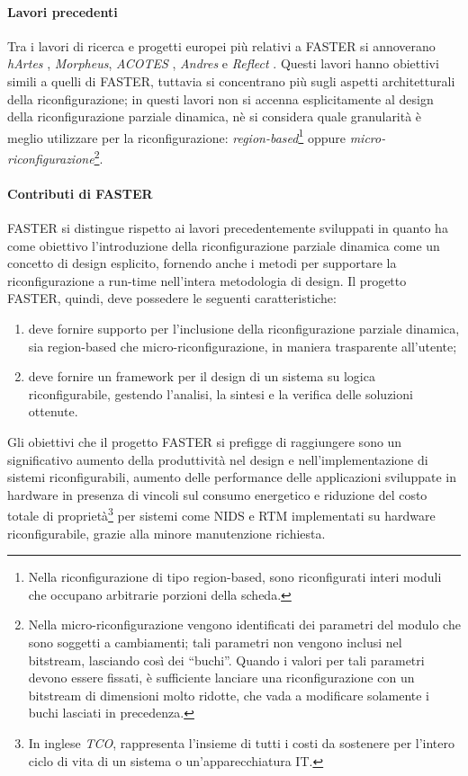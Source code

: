 \paragraph{Lavori precedenti}
Tra i lavori di ricerca e progetti europei più relativi a \ac{FASTER} si 
annoverano \emph{hArtes} \cite{HArtes}, \emph{Morpheus}, \emph{ACOTES} 
\cite{AcotesUrl, ACOTES}, \emph{Andres} e \emph{Reflect} \cite{Reflect}. %
Questi lavori hanno obiettivi simili a quelli di \ac{FASTER}, tuttavia si 
concentrano più sugli aspetti architetturali della riconfigurazione; in questi 
lavori non si accenna esplicitamente al design della riconfigurazione parziale 
dinamica, nè si considera quale granularità è meglio utilizzare per la 
riconfigurazione: \emph{region-based}\footnote{Nella riconfigurazione di tipo 
region-based, sono riconfigurati interi moduli che occupano arbitrarie porzioni 
della scheda.} oppure \emph{micro-riconfigurazione}\footnote{Nella 
micro-riconfigurazione vengono identificati dei parametri del modulo che 
sono soggetti a cambiamenti; tali parametri non vengono inclusi nel bitstream, 
lasciando così dei ``buchi''. Quando i valori per tali parametri devono essere 
fissati, è sufficiente lanciare una riconfigurazione con un bitstream di 
dimensioni molto ridotte, che vada a modificare solamente i buchi lasciati in 
precedenza.}.

\paragraph{Contributi di \ac{FASTER}}
\ac{FASTER} si distingue rispetto ai lavori precedentemente sviluppati in 
quanto ha come obiettivo l'introduzione della riconfigurazione parziale 
dinamica come un concetto di design esplicito, fornendo anche i metodi per 
supportare la riconfigurazione a run-time nell'intera metodologia di design.
Il progetto \ac{FASTER}, quindi, deve possedere le seguenti caratteristiche:
\begin{enumerate}
 \item deve fornire supporto per l'inclusione della riconfigurazione parziale 
dinamica, sia region-based che micro-riconfigurazione, in maniera trasparente 
all'utente;
 \item deve fornire un framework per il design di un sistema su logica 
riconfigurabile, gestendo l'analisi, la sintesi e la verifica delle soluzioni 
ottenute.
\end{enumerate}

Gli obiettivi che il progetto \ac{FASTER} si prefigge di raggiungere sono un 
significativo aumento della produttività nel design e nell'implementazione di 
sistemi riconfigurabili, aumento delle performance delle applicazioni 
sviluppate in hardware in presenza di vincoli sul consumo energetico e 
riduzione del costo totale di proprietà\footnote{In inglese \emph{\ac{TCO}}, 
rappresenta l'insieme di tutti i costi da sostenere per l'intero ciclo di 
vita di un sistema o un'apparecchiatura IT.} per sistemi come \ac{NIDS} e 
\ac{RTM} implementati su hardware riconfigurabile, grazie alla minore 
manutenzione richiesta.

